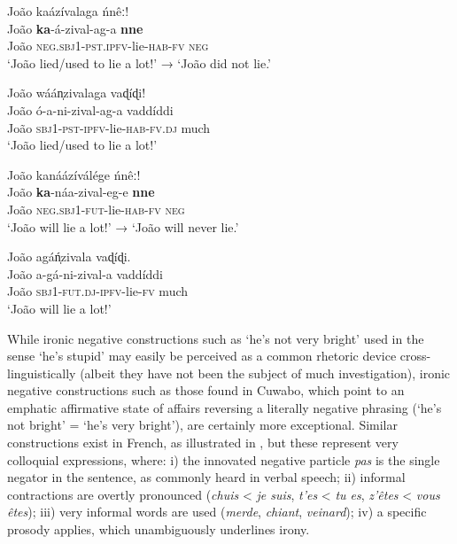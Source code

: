 \documentclass[output=paper,colorlinks=true, citecolor=brown,draftmode]{langscibook}
\begin{document}
{\ea\label{ex:cuw:96}
    \ea\label{ex:cuw:96a}João kaázívalaga ńnêː! \\ 
        \gll  João \textbf{ka}{}-á-zival-ag-a \textbf{nne}  \\
               João \textsc{neg.sbj1-pst.ipfv}{}-lie-\textsc{hab-fv} \textsc{neg} \\
        \glt  *‘João lied/used to lie a lot!’ → ‘João did not lie.’

    \ex\label{ex:cuw:96b} João wáán̩zivalaga vaɖíɖi! \\
        \gll João ó-a-ni-zival-ag-a vaddíddi \\
              João \textsc{sbj1-pst-ipfv}{}-lie-\textsc{hab-fv.dj} much  \\
        \glt  ‘João lied/used to lie a lot!’
    \z
\z }

\ea\label{ex:cuw:97}
    \ea\label{ex:cuw:97a} João kanáázíválége ńnêː!\\
        \gll  João \textbf{ka}{}-náa-zival-eg-e \textbf{nne} \\
               João \textsc{neg.sbj1-fut}{}-lie-\textsc{hab-fv} \textsc{neg} \\
        \glt  *‘João will lie a lot!’ → ‘João will never lie.’

    \ex\label{ex:cuw:97b} João agáń̩zivala vaɖíɖi.\\
        \gll João a-gá-ni-zival-a vaddíddi \\
               João \textsc{sbj1-fut.dj-ipfv}{}-lie-\textsc{fv} much \\
        \glt  ‘João will lie a lot!’

    \z
\z 

While ironic negative constructions such as ‘he’s not very bright’ used in the sense ‘he’s stupid’ may easily be perceived as a common rhetoric device cross-linguistically (albeit they have not been the subject of much investigation), ironic negative constructions such as those found in Cuwabo, which point to an emphatic affirmative state of affairs reversing a literally negative phrasing (‘he’s not bright’ = ‘he’s very bright’), are certainly more exceptional. Similar constructions exist in French, as illustrated in , but these represent very colloquial expressions, where: i) the innovated negative particle \textit{pas} is the single negator in the sentence, as commonly heard in verbal speech; ii) informal contractions are overtly pronounced (\textit{chuis} < \textit{je suis}, \textit{t’es} < \textit{tu es}, \textit{z’êtes} < \textit{vous êtes}); iii) very informal words are used (\textit{merde}, \textit{chiant}, \textit{veinard}); iv) a specific prosody applies, which unambiguously underlines irony. 
\end{document}
